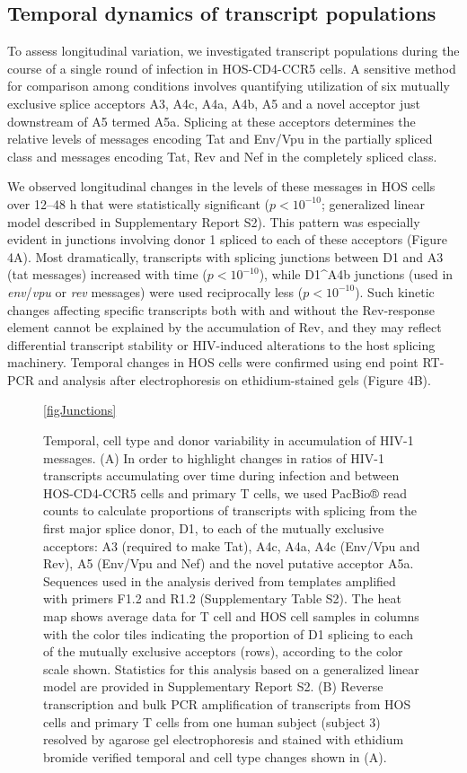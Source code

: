 \documentclass[../sherrill-Mix_thesis.tex]{subfiles}
\begin{document}
\subsection{Temporal dynamics of transcript populations}
To assess longitudinal variation, we investigated \hivEight{} transcript populations during the course of a single round of infection in HOS-CD4-CCR5 cells. A sensitive method for comparison among conditions involves quantifying utilization of six mutually exclusive splice acceptors A3, A4c, A4a, A4b, A5 and a novel acceptor just downstream of A5 termed A5a. Splicing at these acceptors determines the relative levels of messages encoding Tat and Env/Vpu in the partially spliced class and messages encoding Tat, Rev and Nef in the completely spliced class.

We observed longitudinal changes in the levels of these messages in HOS cells over 12--48 h that were statistically significant ($p < 10^{-10}$; generalized linear model described in Supplementary Report S2). This pattern was especially evident in junctions involving donor 1 spliced to each of these acceptors (Figure 4A). Most dramatically, transcripts with splicing junctions between D1 and A3 (tat messages) increased with time ($p < 10^{-10}$), while D1\^{}A4b junctions (used in \textit{env}/\textit{vpu} or \textit{rev} messages) were used reciprocally less ($p < 10^{-10}$). Such kinetic changes affecting specific transcripts both with and without the Rev-response element cannot be explained by the accumulation of Rev, and they may reflect differential transcript stability or HIV-induced alterations to the host splicing machinery. Temporal changes in HOS cells were confirmed using end point RT-PCR and analysis after electrophoresis on ethidium-stained gels (Figure 4B). 

\begin{figure}
	\centering
	\caption[Temporal, cell type and donor variability in accumulation of HIV-1 messages]{Temporal, cell type and donor variability in accumulation of HIV-1 messages. (A) In order to highlight changes in ratios of HIV-1 transcripts accumulating over time during infection and between HOS-CD4-CCR5 cells and primary T cells, we used PacBio® read counts to calculate proportions of transcripts with splicing from the first major splice donor, D1, to each of the mutually exclusive acceptors: A3 (required to make Tat), A4c, A4a, A4c (Env/Vpu and Rev), A5 (Env/Vpu and Nef) and the novel putative acceptor A5a. Sequences used in the analysis derived from templates amplified with primers F1.2 and R1.2 (Supplementary Table S2). The heat map shows average data for T cell and HOS cell samples in columns with the color tiles indicating the proportion of D1 splicing to each of the mutually exclusive acceptors (rows), according to the color scale shown. Statistics for this analysis based on a generalized linear model are provided in Supplementary Report S2. (B) Reverse transcription and bulk PCR amplification of \hivEight{} transcripts from HOS cells and primary T cells from one human subject (subject 3) resolved by agarose gel electrophoresis and stained with ethidium bromide verified temporal and cell type changes shown in (A).}
	\ref{figJunctions}
\end{figure}
\end{document}
